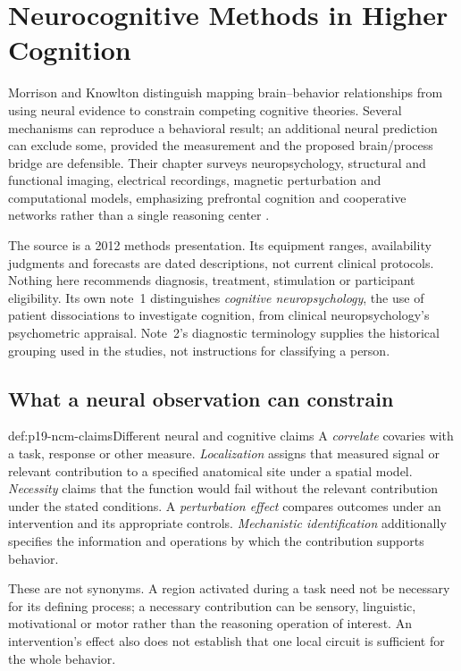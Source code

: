 \chapter{Neurocognitive Methods in Higher Cognition}
\label{sec:p19-neurocognitive-methods}

Morrison and Knowlton distinguish mapping brain--behavior relationships
from using neural evidence to constrain competing cognitive theories.
Several mechanisms can reproduce a behavioral result; an additional
neural prediction can exclude some, provided the measurement and
the proposed brain/process bridge are defensible. Their chapter
surveys neuropsychology, structural and functional imaging, electrical
recordings, magnetic perturbation and computational models, emphasizing
prefrontal cognition and cooperative networks rather than a single
reasoning center \cite[chap.~6, pp.~67--89]{MorrisonKnowlton2012Methods}.

The source is a 2012 methods presentation. Its equipment ranges,
availability judgments and forecasts are dated descriptions, not
current clinical protocols. Nothing here recommends diagnosis,
treatment, stimulation or participant eligibility. Its own note~1
distinguishes \emph{cognitive neuropsychology}, the use of patient
dissociations to investigate cognition, from clinical neuropsychology's
psychometric appraisal. Note~2's diagnostic terminology supplies
the historical grouping used in the studies, not instructions for
classifying a person.

\section{What a neural observation can constrain}
\label{sec:p19-ncm-inference}

\begin{hbdefinition}{def:p19-ncm-claims}{Different neural and cognitive claims}
A \emph{correlate} covaries with a task, response or other measure.
\emph{Localization} assigns that measured signal or relevant contribution
to a specified anatomical site under a spatial model. \emph{Necessity}
claims that the function would fail without the relevant contribution
under the stated conditions. A \emph{perturbation effect} compares
outcomes under an intervention and its appropriate controls.
\emph{Mechanistic identification} additionally specifies the information
and operations by which the contribution supports behavior.

These are not synonyms. A region activated during a task need not
be necessary for its defining process; a necessary contribution can
be sensory, linguistic, motivational or motor rather than the
reasoning operation of interest. An intervention's effect also
does not establish that one local circuit is sufficient for the
whole behavior.
\end{hbdefinition}

